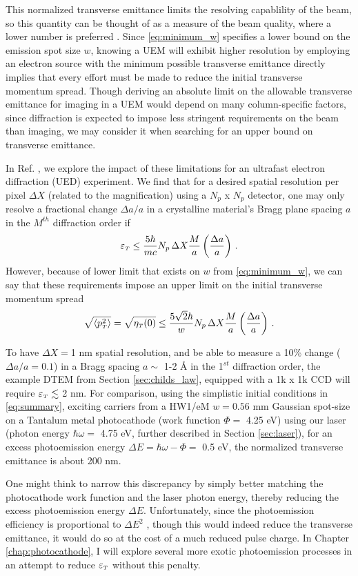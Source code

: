 This normalized transverse emittance limits the resolving capablility of the beam, so this quantity can be thought of as a measure of the beam quality, where a lower number is preferred \cite{berger_dc_2009}.
Since \ref{eq:minimum_w} specifies a lower bound on the emission spot size $w$, knowing a UEM will exhibit higher resolution by employing an electron source with the minimum possible transverse emittance directly implies that every effort must be made to reduce the initial transverse momentum spread.
Though deriving an absolute limit on the allowable transverse emittance for imaging in a UEM would depend on many column-specific factors, since diffraction is expected to impose less stringent requirements on the beam than imaging, we may consider it when searching for an upper bound on transverse emittance.

In Ref. \cite{berger_dc_2009}, we explore the impact of these limitations for an ultrafast electron diffraction (UED) experiment.
We find that for a desired spatial resolution per pixel $\Delta X$ (related to the magnification) using a $N_p$ x $N_p$ detector, one may only resolve a fractional change $\Delta a / a$ in a crystalline material's Bragg plane spacing $a$ in the $M^{th}$ diffraction order if
\begin{equation}
  \varepsilon_{{\scriptscriptstyle T}} \le \frac{5 \hbar}{m c} N_p \, \Delta X \frac{M}{a} \left ( \frac{\Delta a}{a} \right ) \,\text{.}
\end{equation}
However, because of lower limit that exists on $w$ from \ref{eq:minimum_w}, we can say that these requirements impose an upper limit on the initial transverse momentum spread
\begin{equation}
  \sqrt{ \left < p_{{\scriptscriptstyle T}}^2 \right > } = \sqrt{ \eta_{{\scriptscriptstyle T}} (0) } \le \frac{5\sqrt{2} \hbar}{w} N_p \, \Delta X \frac{M}{a} \left ( \frac{\Delta a}{a} \right ) \,\text{.}
\end{equation}

To have $\Delta X = $1 nm spatial resolution, and be able to measure a 10\% change ($\Delta a / a = 0.1$) in a Bragg spacing $a \sim$ 1-2 \AA{} in the 1$^{st}$ diffraction order, the example DTEM from Section \ref{sec:childs_law}, equipped with a 1k x 1k CCD will require $\varepsilon_{{\scriptscriptstyle T}} \lesssim$ 2 nm.
For comparison, using the simplistic initial conditions in \ref{eq:summary}, exciting carriers from a HW1/eM $w = 0.56 \text{ mm}$ Gaussian spot-size on a Tantalum metal photocathode (work function $\Phi =$ 4.25 eV) using our laser (photon energy $\hbar \omega =$ 4.75 eV, further described in Section \ref{sec:laser}), for an excess photoemission energy $\Delta E = \hbar \omega - \Phi =$ 0.5 eV, the normalized transverse emittance is about 200 nm.

One might think to narrow this discrepancy by simply better matching the photocathode work function and the laser photon energy, thereby reducing the excess photoemission energy $\Delta E$.
Unfortunately, since the photoemission efficiency is proportional to $\Delta E^2$ \cite{shalaev_electron_1994}, though this would indeed reduce the transverse emittance, it would do so at the cost of a much reduced pulse charge.
In Chapter \ref{chap:photocathode}, I will explore several more exotic photoemission processes in an attempt to reduce $\varepsilon_{{\scriptscriptstyle T}}$ without this penalty.
